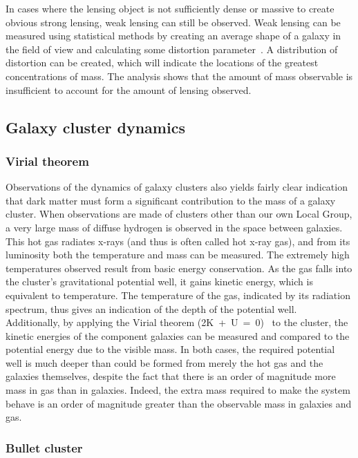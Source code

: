In cases where the lensing object is not sufficiently dense or massive to create obvious strong lensing, weak lensing can still be observed. Weak lensing can be measured using statistical methods by creating an average shape of a galaxy in the field of view and calculating some distortion parameter~\cite{Bartelmann:1999yn}. A distribution of distortion can be created, which will indicate the locations of the greatest concentrations of mass. The analysis shows that the amount of mass observable is insufficient to account for the amount of lensing observed.

\subsection{Galaxy cluster dynamics}

\subsubsection{Virial theorem}

Observations of the dynamics of galaxy clusters also yields fairly clear indication that dark matter must form a significant contribution to the mass of a galaxy cluster. When observations are made of clusters other than our own Local Group, a very large mass of diffuse hydrogen is observed in the space between galaxies. This hot gas radiates x-rays (and thus is often called hot x-ray gas), and from its luminosity both the temperature and mass can be measured. The extremely high temperatures observed result from basic energy conservation. As the gas falls into the cluster's gravitational potential well, it gains kinetic energy, which is equivalent to temperature. The temperature of the gas, indicated by its radiation spectrum, thus gives an indication of the depth of the potential well. Additionally, by applying the Virial theorem (2K~+~U~=~0)~\cite{Claussius:1870} to the cluster, the kinetic energies of the component galaxies can be measured and compared to the potential energy due to the visible mass. In both cases, the required potential well is much deeper than could be formed from merely the hot gas and the galaxies themselves, despite the fact that there is an order of magnitude more mass in gas than in galaxies. Indeed, the extra mass required to make the system behave is an order of magnitude greater than the observable mass in galaxies and gas.

\subsubsection{Bullet cluster}

